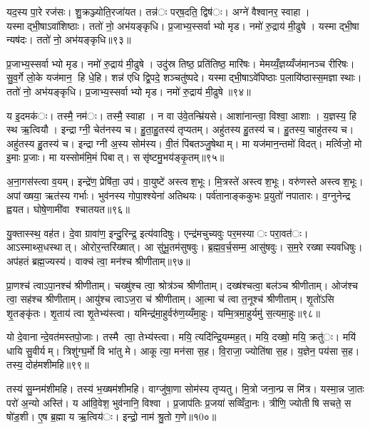 यद॒स्य पा॒रे रज॑सः। शु॒क्रञ्ज्योति॒रजा॑यत। तन्न॑ः पर्‌ष॒दति॒ द्विष॑ः। अग्ने॑ वैश्वानर॒ स्वाहा। यस्माद्भी॒षाऽवा॑शिष्ठाः। ततो॑ नो॒ अभ॑यङ्कृधि। प्र॒जाभ्य॒स्सर्वाभ्यो मृड। नमो॑ रु॒द्राय॑ मी॒ढुषे। यस्माद्भी॒षा न्यष॑दः। ततो॑ नो॒ अभ॑यङ्कृधि॥९३॥

प्र॒जाभ्य॒स्सर्वाभ्यो मृड। नमो॑ रु॒द्राय॑ मी॒ढुषे। उदु॑स्र तिष्ठ॒ प्रति॑तिष्ठ॒ मारि॑षः। मेमय्यँ॒ज्ञय्यँज॑मानञ्च रीरिषः। सु॒व॒र्गे लो॒के यज॑मान॒ हि धे॒हि। शन्न॑ एधि द्वि॒पदे॒ शञ्चतु॑ष्पदे। यस्माद्भी॒षाऽवे॑पिष्ठाः प॒लायि॑ष्ठास्स॒मज्ञास्थाः। ततो॑ नो॒ अभ॑यङ्कृधि। प्र॒जाभ्य॒स्सर्वाभ्यो मृड। नमो॑ रु॒द्राय॑ मी॒ढुषे॥९४॥

य इ॒दमक॑ः। तस्मै॒ नम॑ः। तस्मै॒ स्वाहा। न वा उ॑वे॒तन्म्रि॑यसे। आशा॑नान्त्वा॒ विश्वा॒ आशाः। य॒ज्ञस्य॒ हि स्थ ऋ॒त्वियौ। इन्द्राग्नी॒ चेत॑नस्य च। हु॒ता॒हु॒तस्य॑ तृप्यतम्। अहु॑तस्य हु॒तस्य॑ च। हु॒तस्य॒ चाहु॑तस्य च। अहु॑तस्य हु॒तस्य॑ च। इन्द्राग्नी अ॒स्य सोम॑स्य। वी॒तं पि॑बतञ्जु॒षेथाम्। मा यज॑मान॒न्तमो॑ विदत्। मर्त्विजो॒ मो इ॒माः प्र॒जाः। मा यस्सोम॑मि॒मं पिबात्। ससृ॑ष्टमु॒भय॑ङ्कृ॒तम्॥९५॥


अ॒ना॒गस॑स्त्वा व॒यम्। इन्द्रे॑ण॒ प्रेषि॑ता॒ उप॑। वा॒युष्टे॑ अस्त्वश॒भूः। मि॒त्रस्ते॑ अस्त्वश॒भूः। वरु॑णस्ते अस्त्वश॒भूः। अपांख्षया॒ ऋत॑स्य गर्भाः। भुव॑नस्य गोपा॒श्श्येना॑ अतिथयः। पर्व॑तानाङ्ककुभः प्र॒युतो॑ नपातारः। व॒ग्नुनेन्द्र ह्वयत। घोषे॒णामी॑वा श्चातयत॥९६॥

यु॒क्तास्स्थ॒ वह॑त। दे॒वा ग्रावा॑ण॒ इन्दु॒रिन्द्र॒ इत्य॑वादिषुः। एन्द्र॑मचुच्यवुः पर॒मस्याः परा॒वत॑ः। आऽस्माथ्स॒धस्थात्। ओरोर॒न्तरि॑ख्षात्। आ सु॑भू॒तम॑सुषवुः। ब्र॒ह्म॒व॒र्च॒सम्म॒ आसु॑षवुः। स॒म॒रे रख्षास्यवधिषुः। अप॑हतं ब्रह्म॒ज्यस्य॑। वाक्च॑ त्वा॒ मन॑श्च श्रीणीताम्॥९७॥

प्रा॒णश्च॑ त्वाऽपा॒नश्च॑ श्रीणीताम्। चख्षु॑श्च त्वा॒ श्रोत्र॑ञ्च श्रीणीताम्। दख्ष॑श्चत्वा॒ बल॑ञ्च श्रीणीताम्। ओज॑श्च त्वा॒ सह॑श्च श्रीणीताम्। आयु॑श्च त्वाऽज॒रा च॑ श्रीणीताम्। आ॒त्मा च॑ त्वा त॒नूश्च॑ श्रीणीताम्। शृ॒तो॑ऽसि शृ॒तङ्कृ॑तः। शृ॒ताय॑ त्वा शृ॒तेभ्य॑स्त्वा। यमिन्द्र॑मा॒हुर्वरु॑ण॒य्यँमा॒हुः। यम्मि॒त्रमा॒हुर्यमु॑ स॒त्यमा॒हुः॥९८॥

यो दे॒वानान्दे॒वत॑मस्तपो॒जाः। तस्मै त्वा॒ तेभ्य॑स्त्वा। मयि॒ त्यदि॑न्द्रि॒यम्मह॒त्। मयि॒ दख्षो॒ मयि॒ क्रतु॑ः। मयि॑ धायि सु॒वीर्यम्। त्रिशु॑ग्घ॒र्मो वि भा॑तु मे। आकूत्या॒ मन॑सा स॒ह। वि॒राजा॒ ज्योति॑षा स॒ह। य॒ज्ञेन॒ पय॑सा स॒ह। तस्य॒ दोह॑मशीमहि॥९९॥

तस्य॑ सु॒म्नम॑शीमहि। तस्य॑ भ॒ख्षम॑शीमहि। वाग्जु॑षा॒णा सोम॑स्य तृप्यतु। मि॒त्रो जना॒न्प्र स मि॑त्र। यस्मा॒न्न जा॒तः परो॑ अ॒न्यो अस्ति॑। य आ॑वि॒वेश॒ भुव॑नानि॒ विश्वा। प्र॒जाप॑तिः प्र॒जया॑ सव्विँदा॒नः। त्रीणि॒ ज्योतीषि सचते॒ स षो॑ड॒शी। ए॒ष ब्र॒ह्मा य ऋ॒त्विय॑ः। इन्द्रो॒ नाम॑ श्रु॒तो ग॒णे॥१0०॥

